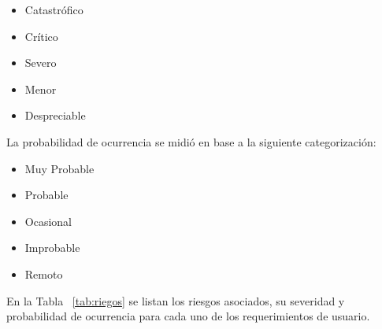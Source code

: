 		\begin{itemize}
		  \item Catastrófico
		  \item Crítico	
		  \item Severo	
		  \item Menor	
		  \item Despreciable 
		\end{itemize}
	
		La probabilidad de ocurrencia se midió en base a la siguiente categorización:
	
		\begin{itemize}
		  \item Muy Probable
		  \item Probable	
		  \item Ocasional
		  \item Improbable 	
		  \item Remoto
		\end{itemize}
		
		En la Tabla ~\ref {tab:riegos} se listan los riesgos asociados, su severidad y probabilidad de ocurrencia para cada uno de los
		requerimientos de usuario.
		
